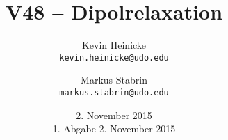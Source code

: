



\title{%
    V48 -- Dipolrelaxation
}
\author{%
    Kevin Heinicke\\
    \texttt{kevin.heinicke@udo.edu}
    \and
    Markus Stabrin\\
    \texttt{markus.stabrin@udo.edu}
}
\date{%
    2. November 2015\\
    {\small 1. Abgabe} 2. November 2015\\
}

    \maketitle%
    \newpage
    \tableofcontents
    \newpage

    \printbibliography

